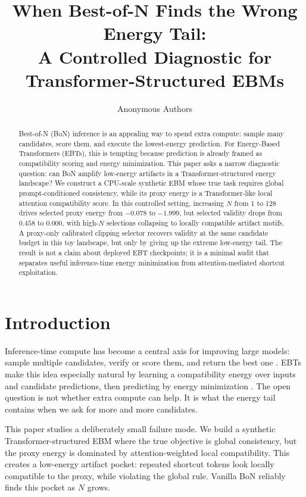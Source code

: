 \documentclass{article}
\title{When Best-of-N Finds the Wrong Energy Tail:\\
A Controlled Diagnostic for Transformer-Structured EBMs}
\author{Anonymous Authors}
\begin{document}
\maketitle

\begin{abstract}
Best-of-N (BoN) inference is an appealing way to spend extra compute: sample
many candidates, score them, and execute the lowest-energy prediction. For
Energy-Based Transformers (EBTs), this is tempting because prediction is already
framed as compatibility scoring and energy minimization. This paper asks a
narrow diagnostic question: can BoN amplify low-energy artifacts in a
Transformer-structured energy landscape? We construct a CPU-scale synthetic EBM
whose true task requires global prompt-conditioned consistency, while its proxy
energy is a Transformer-like local attention compatibility score. In this
controlled setting, increasing $N$ from 1 to 128 drives selected proxy energy
from $-0.078$ to $-1.999$, but selected validity drops from $0.458$ to $0.000$,
with high-$N$ selections collapsing to locally compatible artifact motifs. A
proxy-only calibrated clipping selector recovers validity at the same candidate
budget in this toy landscape, but only by giving up the extreme low-energy tail.
The result is not a claim about deployed EBT checkpoints; it is a minimal audit
that separates useful inference-time energy minimization from attention-mediated
shortcut exploitation.
\end{abstract}

\section{Introduction}

Inference-time compute has become a central axis for improving large models:
sample multiple candidates, verify or score them, and return the best one
\citep{cobbe2021training,wang2023selfconsistency,snell2024scaling}. EBTs make
this idea especially natural by learning a compatibility energy over inputs and
candidate predictions, then predicting by energy minimization
\citep{gladstone2026ebt}. The open question is not whether extra compute can
help. It is what the energy tail contains when we ask for more and more
candidates.

This paper studies a deliberately small failure mode. We build a synthetic
Transformer-structured EBM where the true objective is global consistency, but
the proxy energy is dominated by attention-weighted local compatibility. This
creates a low-energy artifact pocket: repeated shortcut tokens look locally
compatible to the proxy, while violating the global rule. Vanilla BoN reliably
finds this pocket as $N$ grows.
\end{document}
